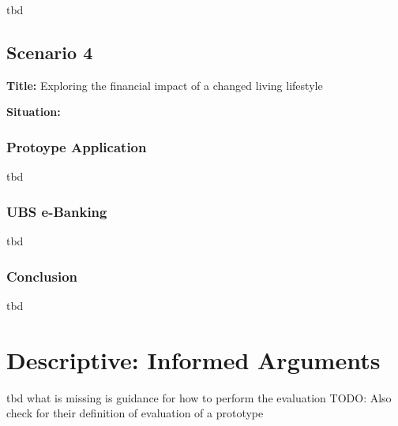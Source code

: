 tbd





\subsection{Scenario 4}

\textbf{Title:} Exploring the financial impact of a changed living lifestyle

\textbf{Situation:}


\subsubsection{Protoype Application}

tbd



\subsubsection{UBS e-Banking}

tbd


\subsubsection{Conclusion}

tbd





\section{Descriptive: Informed Arguments}

tbd
what is missing is guidance for how to perform the evaluation
TODO: Also check \cite{Peffers2012} for their definition of evaluation of a prototype


